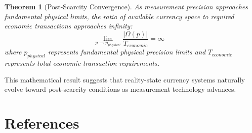 \documentclass[12pt,a4paper]{article}
\newtheorem{theorem}{Theorem}
\begin{document}
\begin{theorem}[Post-Scarcity Convergence]
As measurement precision approaches fundamental physical limits, the ratio of available currency space to required economic transactions approaches infinity:
\begin{equation}
\lim_{p \to p_{physical}} \frac{|\Omega(p)|}{T_{economic}} = \infty
\end{equation}
where $p_{physical}$ represents fundamental physical precision limits and $T_{economic}$ represents total economic transaction requirements.
\end{theorem}

This mathematical result suggests that reality-state currency systems naturally evolve toward post-scarcity conditions as measurement technology advances.

\section{References}
\end{document}
